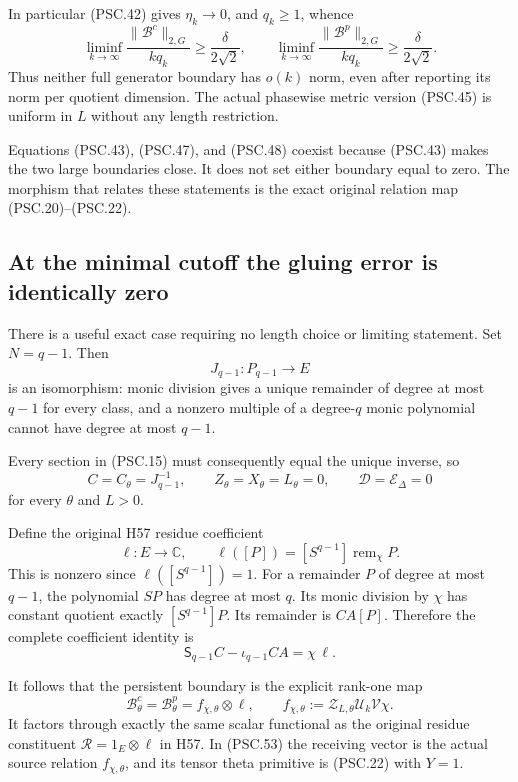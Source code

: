 In particular (PSC.42) gives \(\eta_k\to0\), and \(q_k\geq1\), whence
\[
 \liminf_{k\to\infty}
 \frac{\|\mathscr B^c\|_{2,G}}{kq_k}
 \geq\frac{\delta}{2\sqrt2},\qquad
 \liminf_{k\to\infty}
 \frac{\|\mathscr B^p\|_{2,G}}{kq_k}
 \geq\frac{\delta}{2\sqrt2}.
 \tag{PSC.49}
\]
Thus neither full generator boundary has \(o(k)\) norm, even after reporting its norm per quotient dimension. The actual phasewise metric version (PSC.45) is uniform in \(L\) without any length restriction.

Equations (PSC.43), (PSC.47), and (PSC.48) coexist because (PSC.43) makes the two large boundaries close. It does not set either boundary equal to zero. The morphism that relates these statements is the exact original relation map (PSC.20)–(PSC.22).

\subsection{At the minimal cutoff the gluing error is identically zero}

There is a useful exact case requiring no length choice or limiting statement. Set \(N=q-1\). Then
\[
 J_{q-1}:P_{q-1}\longrightarrow E
 \]
is an isomorphism: monic division gives a unique remainder of degree at most \(q-1\) for every class, and a nonzero multiple of a degree-\(q\) monic polynomial cannot have degree at most \(q-1\).

Every section in (PSC.15) must consequently equal the unique inverse, so
\[
 C=C_\theta=J_{q-1}^{-1},\qquad
 Z_\theta=X_\theta=L_\theta=0,\qquad
 \mathscr D=\mathscr E_\Delta=0
 \tag{PSC.50}
\]
for every \(\theta\) and \(L>0\).

Define the original H57 residue coefficient
\[
 \ell:E\longrightarrow\mathbb C,\qquad
 \ell([P])=[S^{q-1}]\operatorname{rem}_\chi P.
 \tag{PSC.51}
\]
This is nonzero since \(\ell([S^{q-1}])=1\).
For a remainder \(P\) of degree at most \(q-1\), the polynomial \(SP\) has degree at most \(q\). Its monic division by \(\chi\) has constant quotient exactly \([S^{q-1}]P\). Its remainder is \(C A[P]\). Therefore the complete coefficient identity is
\[
 \mathsf S_{q-1}C-\iota_{q-1}CA=\chi\,\ell.
 \tag{PSC.52}
\]

It follows that the persistent boundary is the explicit rank-one map
\[
 \boxed{
 \mathscr B^c_\theta=\mathscr B^p_\theta
 =f_{\chi,\theta}\otimes\ell,\qquad
 f_{\chi,\theta}
 :=\mathcal Z_{L,\theta}\mathcal U_k\mathcal V\chi.}
 \tag{PSC.53}
\]
It factors through exactly the same scalar functional as the original residue constituent
\(\mathcal R=1_E\otimes\ell\) in H57. In (PSC.53) the receiving vector is the actual source relation \(f_{\chi,\theta}\), and its tensor theta primitive is (PSC.22) with \(Y=1\).

